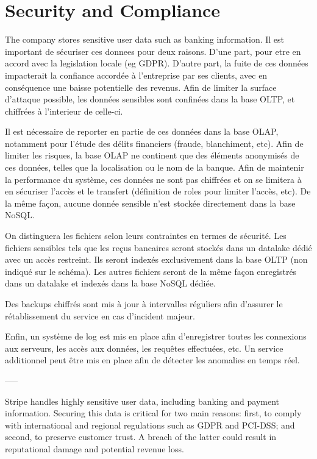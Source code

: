 \documentclass[11pt,a4paper,computermodern]{article}
\begin{document}
\section*{Security and Compliance}

The company stores sensitive user data such as banking information. Il est important de sécuriser ces donnees pour deux raisons. D'une part, pour etre en accord avec la legislation locale (eg GDPR). D'autre part, la fuite de ces données impacterait la confiance accordée à l'entreprise par ses clients, avec en conséquence une baisse potentielle des revenus. Afin de limiter la surface d'attaque possible, les données sensibles sont confinées dans la base OLTP, et chiffrées à l'interieur de celle-ci.

Il est nécessaire de reporter en partie de ces données dans la base OLAP, notamment pour l'étude des délits financiers (fraude, blanchiment, etc). Afin de limiter les risques, la base OLAP ne continent que des éléments anonymisés de ces données, telles que la localisation ou le nom de la banque. Afin de maintenir la performance du système, ces données ne sont pas chiffrées et on se limitera à en sécuriser l'accès et le transfert (définition de roles pour limiter l'accès, etc). De la même façon, aucune donnée sensible n'est stockée directement dans la base NoSQL.

On distinguera les fichiers selon leurs contraintes en termes de sécurité. Les fichiers sensibles tels que les reçus bancaires seront stockés dans un datalake dédié avec un accès restreint. Ils seront indexés exclusivement dans la base OLTP (non indiqué sur le schéma). Les autres fichiers seront de la même façon enregistrés dans un datalake et indexés dans la base NoSQL dédiée.

Des backups chiffrés sont mis à jour à intervalles réguliers afin d'assurer le rétablissement du service en cas d'incident majeur.

Enfin, un système de log est mis en place afin d'enregistrer toutes les connexions aux serveurs, les accès aux données, les requêtes effectuées, etc. Un service additionnel peut être mis en place afin de détecter les anomalies en temps réel.

-----

Stripe handles highly sensitive user data, including banking and payment information. Securing this data is critical for two main reasons: first, to comply with international and regional regulations such as GDPR and PCI-DSS; and second, to preserve customer trust. A breach of the latter could result in reputational damage and potential revenue loss.
\end{document}

